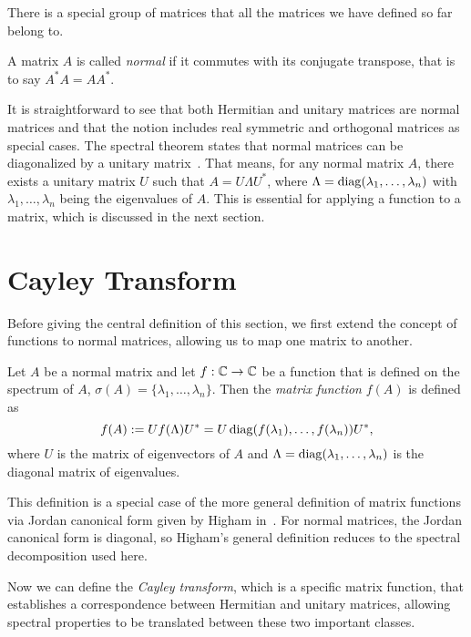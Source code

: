 There is a special group of matrices that all the matrices we have defined so far belong to.

\begin{definition}
    A matrix $A$ is called \emph{normal} if it commutes with its conjugate transpose,
    that is to say $A^* A = A A^*$.
\end{definition}

It is straightforward to see that both Hermitian and unitary matrices are normal matrices and that the notion includes real symmetric and orthogonal matrices as special cases. The spectral theorem states that normal matrices can be diagonalized by a unitary matrix~\cite[Thm.~7.24, p.~218]{sheldonaxler}. That means, for any normal matrix $A$, there exists a unitary matrix $U$ such that $A = U \Lambda U^*$, where $\Lambda = \operatorname{diag}(\lambda_1, \ldots, \lambda_n)$ with $\lambda_1, \ldots, \lambda_n$ being the eigenvalues of $A$. This is essential for applying a function to a matrix, which is discussed in the next section.

\section{Cayley Transform}

Before giving the central definition of this section, we first extend the concept of functions to normal matrices, allowing us to map one matrix to another.

\begin{definition}
    Let $A$ be a normal matrix and let $f: \mathbb{C} \to \mathbb{C}$ be a function that is defined on the spectrum of $A$,
    $\sigma(A) = \{\lambda_1, \ldots, \lambda_n\}$.
    Then the \emph{matrix function} $f(A)$ is defined as
    \[
    f(A) := U f(\Lambda) U^* = U \operatorname{diag}(f(\lambda_1), \ldots, f(\lambda_n)) U^*,
    \]
    where $U$ is the matrix of eigenvectors of $A$ and $\Lambda = \operatorname{diag}(\lambda_1, \ldots, \lambda_n)$ is the diagonal matrix of eigenvalues.
\end{definition}

This definition is a special case of the more general definition of matrix functions via Jordan canonical form given by Higham in~\cite[p.~3]{higham}. For normal matrices, the Jordan canonical form is diagonal, so Higham’s general definition reduces to the spectral decomposition used here.

Now we can define the \emph{Cayley transform}, which is a specific matrix function, that establishes a correspondence between Hermitian and unitary matrices, allowing spectral properties to be translated between these two important classes.

